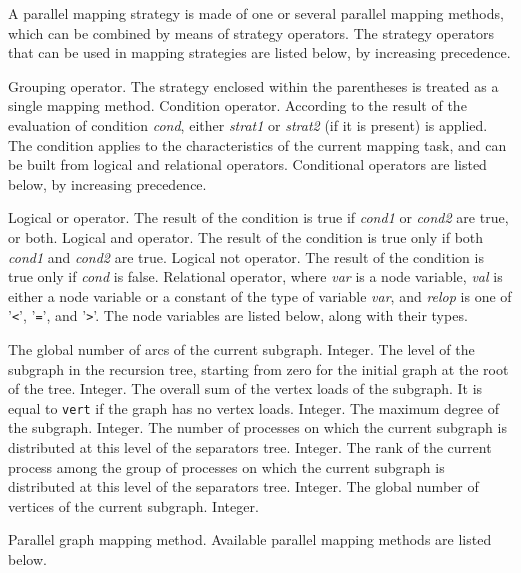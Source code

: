 A parallel mapping strategy is made of one or several parallel
mapping methods, which can be combined by means of strategy
operators. The strategy operators that can be used in mapping
strategies are listed below, by increasing precedence.
\begin{itemize}
\iteme[{\tt (}{\it strat\/}{\tt )}]
Grouping operator.
The strategy enclosed within the parentheses is treated as a single
mapping method.
Condition operator. According to the result of the evaluation of
condition {\it cond}, either {\it strat1\/} or {\it strat2\/} (if it
is present) is applied. The condition applies to the characteristics
of the current mapping task, and can be built from logical and
relational operators. Conditional operators are listed below, by
increasing precedence.
\begin{itemize}
Logical or operator. The result of the condition is true if {\it cond1\/}
or {\it cond2\/} are true, or both.
Logical and operator. The result of the condition is true only if both
{\it cond1\/} and {\it cond2\/} are true.
\iteme[{\tt !}{\it cond}]
Logical not operator. The result of the condition is true only if
{\it cond\/} is false.
Relational operator, where {\it var\/} is a node variable, {\it val\/} is
either a node variable or a constant of the type of variable {\it var}, and
{\it relop\/} is one of '{\tt\verb+<+}', '{\tt\verb+=+}', and '{\tt\verb+>+}'.
The node variables are listed below, along with their types.
\begin{itemize}
\iteme[{\tt edge}]
The global number of arcs of the current subgraph.
Integer.
\iteme[{\tt levl}]
The level of the subgraph in the recursion tree, starting from zero
for the initial graph at the root of the tree.
Integer.
\iteme[{\tt load}]
The overall sum of the vertex loads of the subgraph. It is equal to
{\tt vert} if the graph has no vertex loads.
Integer.
\iteme[{\tt mdeg}]
The maximum degree of the subgraph.
Integer.
\iteme[{\tt proc}]
The number of processes on which the current subgraph is distributed
at this level of the separators tree.
Integer.
\iteme[{\tt rank}]
The rank of the current process among the group of processes on
which the current subgraph is distributed at this level of the
separators tree.
Integer.
\iteme[{\tt vert}]
The global number of vertices of the current subgraph.
Integer.
\end{itemize}
\end{itemize}
\iteme[{\it method\/}{[{\tt \{}{\it parameters\/}{\tt \}}]}]
Parallel graph mapping method. Available parallel mapping methods
are listed below.
\end{itemize}
